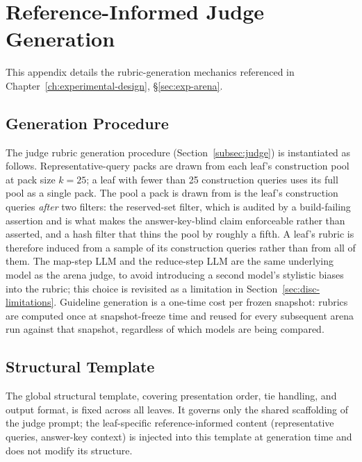 \chapter{Reference-Informed Judge Generation}\label{app:judge-generation}

This appendix details the rubric-generation mechanics referenced in
Chapter~\ref{ch:experimental-design}, \S\ref{sec:exp-arena}.

\section{Generation Procedure}

The judge rubric generation procedure (Section~\ref{subsec:judge}) is
instantiated as follows. Representative-query packs are drawn from
each leaf's construction pool at pack size $k = 25$; a leaf with fewer
than 25 construction queries uses its full pool as a single pack.
The pool a pack is drawn from is the leaf's construction queries
\emph{after} two filters: the reserved-set filter, which is audited by
a build-failing assertion and is what makes the answer-key-blind claim
enforceable rather than asserted, and a hash filter that thins the pool
by roughly a fifth. A leaf's rubric is therefore induced from a sample
of its construction queries rather than from all of them.
The map-step LLM and the reduce-step LLM are the same underlying model
as the arena judge, to avoid introducing a second
model's stylistic biases into the rubric; this choice is revisited as
a limitation in Section~\ref{sec:disc-limitations}. Guideline generation is
a one-time cost per frozen snapshot: rubrics are computed once at
snapshot-freeze time and reused for every subsequent arena run against
that snapshot, regardless of which models are being compared.

\section{Structural Template}\label{sec:judge-template-full}

The global structural template, covering presentation order, tie
handling, and output format, is fixed across all leaves. It governs
only the shared scaffolding of the judge prompt; the leaf-specific
reference-informed content (representative queries, answer-key
context) is injected into this template at generation time and does
not modify its structure.


